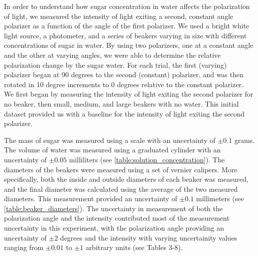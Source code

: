 
In order to understand how sugar concentration in water affects the polarization of light, we measured the intensity of light exiting a second, constant angle polarizer as a function of the angle of the first polarizer. We used a bright white light source, a photometer, and a series of beakers varying in size with different concentrations of sugar in water. By using two polarizers, one at a constant angle and the other at varying angles, we were able to determine the relative polarization change by the sugar water. For each trial, the first (varying) polarizer began at 90 degrees to the second (constant) polarizer, and was then rotated in 10 degree increments to 0 degrees relative to the constant polarizer. We first began by measuring the intensity of light exiting the second polarizer for no beaker, then small, medium, and large beakers with no water. This initial dataset provided us with a baseline for the intensity of light exiting the second polarizer.

The mass of sugar was measured using a scale with an uncertainty of $\pm 0.1$ grams. The volume of water was measured using a graduated cylinder with an uncertainty of $\pm 0.05$ milliliters (see \ref{table:solution_concentration}). The diameters of the beakers were measured using a set of vernier calipers. More specifically, both the inside and outside diameters of each beaker was measured, and the final diameter was calculated using the average of the two measured diameters. This measurement provided an uncertainty of $\pm 0.1$ millimeters (see \ref{table:beaker_diameters}). The uncertainty in measurement of both the polarization angle and the intensity contributed most of the measurement uncertainty in this experiment, with the polarization angle providing an uncertainty of $\pm 2$ degrees and the intensity with varying uncertainity values ranging from $\pm 0.01$ to $\pm 1$ arbitrary units (see Tables 3-8).

